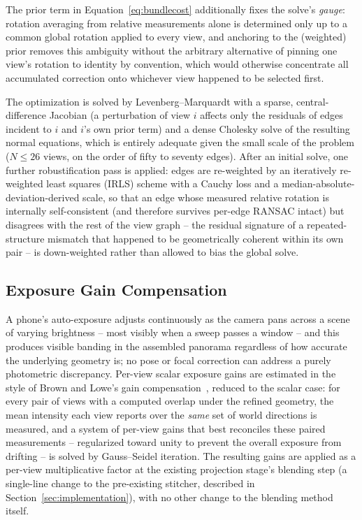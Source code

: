 \documentclass[11pt]{article}
\begin{document}
The prior term in Equation~\eqref{eq:bundlecost} additionally fixes the solve's \emph{gauge}: rotation averaging from relative measurements alone is determined only up to a common global rotation applied to every view, and anchoring to the (weighted) prior removes this ambiguity without the arbitrary alternative of pinning one view's rotation to identity by convention, which would otherwise concentrate all accumulated correction onto whichever view happened to be selected first.

The optimization is solved by Levenberg--Marquardt with a sparse, central-difference Jacobian (a perturbation of view $i$ affects only the residuals of edges incident to $i$ and $i$'s own prior term) and a dense Cholesky solve of the resulting normal equations, which is entirely adequate given the small scale of the problem ($N\le26$ views, on the order of fifty to seventy edges). After an initial solve, one further robustification pass is applied: edges are re-weighted by an iteratively re-weighted least squares (IRLS) scheme with a Cauchy loss and a median-absolute-deviation-derived scale, so that an edge whose measured relative rotation is internally self-consistent (and therefore survives per-edge RANSAC intact) but disagrees with the rest of the view graph -- the residual signature of a repeated-structure mismatch that happened to be geometrically coherent within its own pair -- is down-weighted rather than allowed to bias the global solve.

\subsection{Exposure Gain Compensation}
\label{sec:gain}

A phone's auto-exposure adjusts continuously as the camera pans across a scene of varying brightness -- most visibly when a sweep passes a window -- and this produces visible banding in the assembled panorama regardless of how accurate the underlying geometry is; no pose or focal correction can address a purely photometric discrepancy. Per-view scalar exposure gains are estimated in the style of Brown and Lowe's gain compensation~\cite{brown2007automatic}, reduced to the scalar case: for every pair of views with a computed overlap under the refined geometry, the mean intensity each view reports over the \emph{same} set of world directions is measured, and a system of per-view gains that best reconciles these paired measurements -- regularized toward unity to prevent the overall exposure from drifting -- is solved by Gauss--Seidel iteration. The resulting gains are applied as a per-view multiplicative factor at the existing projection stage's blending step (a single-line change to the pre-existing stitcher, described in Section~\ref{sec:implementation}), with no other change to the blending method itself.
\end{document}
